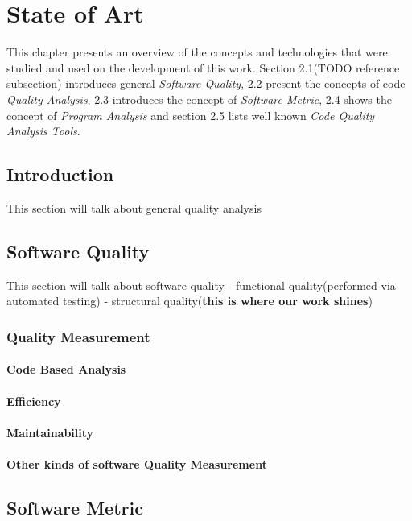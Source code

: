 \chapter{State of Art}
This chapter presents an overview of the concepts and technologies that were studied and used on the development of this work. Section 2.1(TODO reference subsection) introduces general \textit{Software Quality}, 2.2 present the concepts of code \textit{Quality Analysis}, 2.3 introduces the concept of \textit{Software Metric}, 2.4 shows the concept of \textit{Program Analysis} and section 2.5 lists well known \textit{Code Quality Analysis Tools}.  


\section{Introduction}
This section will talk about general quality analysis 



\section{Software Quality}
This section will talk about software quality
- functional quality(performed via automated testing)
- structural quality(\textbf{this is where our work shines})
\subsection{Quality Measurement}

\subsubsection{Code Based Analysis}
\subsubsection{Efficiency}
\subsubsection{Maintainability}
\subsubsection{Other kinds of software Quality Measurement}

\section{Software Metric}
